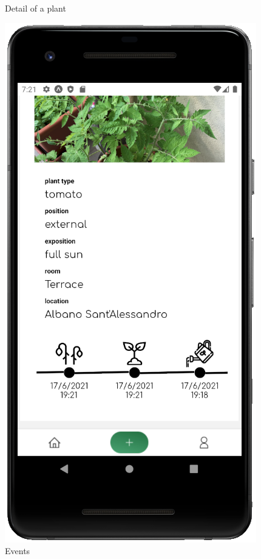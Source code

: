 \documentclass[10pt]{article}
\begin{document}
\begin{figure}[h]
\begin{minipage}[h]{0.4\textwidth}
         \caption{Detail of a plant}
     \end{minipage}%
     \hfill
     \begin{minipage}[h]{0.4\textwidth}
         \centering
         \includegraphics[width=\textwidth]{resources/screens/Details_events_2.PNG}
         \caption{Events}
     \end{minipage}
    \end{figure}
    
\end{document}
